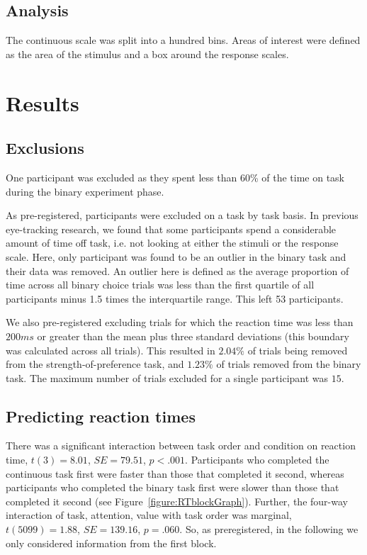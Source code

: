 \documentclass[12pt]{article}
\begin{document}
\subsection{Analysis}
The continuous scale was split into a hundred bins. Areas of interest were defined as the area of the stimulus and a box around the response scales. 

\section{Results}

\subsection{Exclusions}
One participant was excluded as they spent less than 60\% of the time on task during the binary experiment phase. 

As pre-registered, participants were excluded on a task by task basis. In previous eye-tracking research, we found that some participants spend a considerable amount of time off task, i.e. not looking at either the stimuli or the response scale. Here, only participant was found to be an outlier in the binary task and their data was removed. An outlier here is defined as the average proportion of time across all binary choice trials was less than the first quartile of all participants minus 1.5 times the interquartile range. This left 53 participants. 

We also pre-registered excluding trials for which the reaction time was less than $200ms$ or greater than the mean plus three standard deviations (this boundary was calculated across all trials). This resulted in $2.04\%$ of trials being removed from the strength-of-preference task, and $1.23\%$ of trials removed from the binary task. The maximum number of trials excluded for a single participant was $15$. 

\subsection{Predicting reaction times}
There was a significant interaction between task order and condition on reaction time, $t(3)=8.01$, $SE=79.51$, $p<.001$. Participants who completed the continuous task first were faster than those that completed it second, whereas participants who completed the binary task first were slower than those that completed it second (see Figure~\ref{figure:RTblockGraph}). Further, the four-way interaction of task, attention, value with task order was marginal, $t(5099)=1.88$, $SE=139.16$, $p=.060$. So, as preregistered, in the following we only considered information from the first block. 
\end{document}
